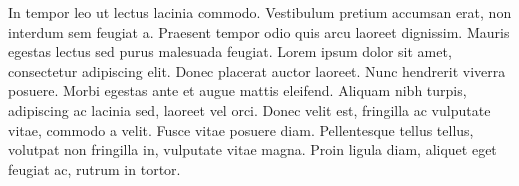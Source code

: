 In tempor leo ut lectus lacinia commodo. Vestibulum pretium accumsan erat, non interdum sem feugiat a. Praesent tempor odio quis arcu laoreet dignissim. Mauris egestas lectus sed purus malesuada feugiat. Lorem ipsum dolor sit amet, consectetur adipiscing elit. Donec placerat auctor laoreet. Nunc hendrerit viverra posuere. Morbi egestas ante et augue mattis eleifend. Aliquam nibh turpis, adipiscing ac lacinia sed, laoreet vel orci. Donec velit est, fringilla ac vulputate vitae, commodo a velit. Fusce vitae posuere diam. Pellentesque tellus tellus, volutpat non fringilla in, vulputate vitae magna. Proin ligula diam, aliquet eget feugiat ac, rutrum in tortor.